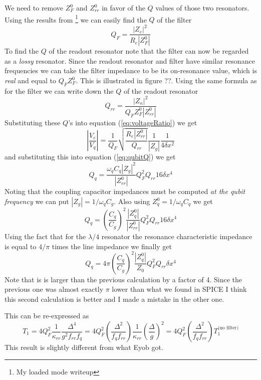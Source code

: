 \documentclass[english,aps,prl]{revtex4}
\begin{document}
We need to remove $Z_F^0$ and $Z_{rr}^0$ in favor of the $Q$ values of those two resonators. Using the results from \footnote{My loaded mode writeup} we can easily find the $Q$ of the filter \begin{equation}
Q_F = \frac{|Z_e|^2}{R_e |Z_F^0|} \end{equation}
To find the $Q$ of the readout resonator note that the filter can now be regarded as a \emph{lossy} resonator. Since the readout resonator and filter have similar resonance frequencies we can take the filter impedance to be its on-resonance value, which is \emph{real} and equal to $Q_F Z_F^0$. This is illustrated in figure ??. Using the same formula as for the filter we can write down the $Q$ of the readout resonator \begin{equation}
Q_{rr} = \frac{|Z_{\kappa}|^2}{Q_F Z_F^0 |Z_{rr}^0|} \end{equation}
Substituting these $Q$'s into equation (\ref{eq:voltageRatio}) we get \begin{equation}
\left| \frac{V_e}{V_q} \right| = \frac{1}{Q_F} \sqrt{\frac{R_e |Z_{rr}^0|}{Q_{rr}}} \frac{1}{|Z_g|} \frac{1}{4\delta x^2} \end{equation}
and substituting this into equation (\ref{eq:qubitQ}) we get \begin{equation}
Q_q = \frac{\omega_q C_q |Z_g|^2}{|Z_{rr}^0|} Q_F^2 Q_{rr} 16 \delta x^4 \end{equation}
Noting that the coupling capacitor impedances must be computed \emph{at the qubit frequency} we can put $|Z_g|=1/\omega_q C_g$. Also using $Z_q^0 = 1/\omega_q C_q$ we get \begin{equation}
Q_q = \left(\frac{C_q}{C_g}\right)^2 \frac{|Z_q^0|}{|Z_{rr}^0|} Q_F^2 Q_{rr} 16 \delta x^4 \end{equation}
Using the fact that for the $\lambda /4$ resonator the resonance characteristic impedance is equal to $4/\pi$ times the line impedance we finally get \begin{equation}
Q_q = 4\pi \left(\frac{C_q}{C_g}\right)^2 \frac{|Z_q^0|}{Z_0} Q_F^2 Q_{rr} \delta x^4 \end{equation}
Note that is is larger than the previous calculation by a factor of 4. Since the previous one was almost exactly $\pi$ lower than what we found in SPICE I think this second calculation is better and I made a mistake in the other one.

This can be re-expressed as \begin{equation}
T_1 = 4Q_F^2 \frac{1}{\kappa_{rr}} \frac{\Delta^4}{g^2 f_{rr}f_q} = 4Q_F^2 \left(\frac{\Delta^2}{f_q f_{rr}}\right) \frac{1}{\kappa_{rr}} \left(\frac{\Delta}{g}\right)^2 = 4 Q_F^2 \left(\frac{\Delta^2}{f_q f_{rr}}\right) T_1^{\textrm{(no filter)}} \end{equation}
This result is slightly different from what Eyob got.
\end{document}
